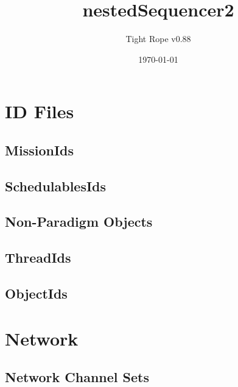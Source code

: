 \documentclass[10pt,a4paper]{article}
\title{nestedSequencer2}
\author{Tight Rope v0.88}
\date{\today}
\begin{document}
\maketitle

\section{ID Files}
\subsection{MissionIds}

\newpage

\subsection{SchedulablesIds}

\newpage

\subsection{Non-Paradigm Objects}
\newpage

\subsection{ThreadIds}

\newpage

\subsection{ObjectIds}

\newpage

\section{Network}
\subsection{Network Channel Sets}




{}
\end{document}
